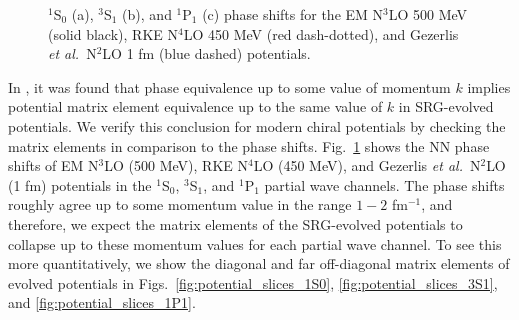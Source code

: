 \documentclass[preprintnumbers,floatfix,aps,prc,preprint,nofootinbib]{revtex4-1}
\begin{document}
\begin{figure}[H]
	\centering
	\quad
	\quad
	\caption{$^1$S$_0$ (a), $^3$S$_1$ (b), and $^1$P$_1$ (c) phase shifts for the EM N$^3$LO 500 MeV (solid black), RKE N$^4$LO 450 MeV (red dash-dotted), and Gezerlis \textit{et al.}~N$^2$LO 1 fm (blue dashed) potentials.}
	\label{fig:phase_shifts}
\end{figure}
%
In \cite{Dainton:2013axa}, it was found that phase equivalence up to some value of momentum $k$ implies potential matrix element equivalence up to the same value of $k$ in SRG-evolved potentials. We verify this conclusion for modern chiral potentials by checking the matrix elements in comparison to the phase shifts. Fig.~\ref{fig:phase_shifts} shows the NN phase shifts of EM N$^3$LO (500 MeV), RKE N$^4$LO (450 MeV), and Gezerlis \textit{et al.}~N$^2$LO (1 fm) potentials in the $^1$S$_0$, $^3$S$_1$, and $^1$P$_1$ partial wave channels. The phase shifts roughly agree up to some momentum value in the range $1-2$ fm$^{-1}$, and therefore, we expect the matrix elements of the SRG-evolved potentials to collapse up to these momentum values for each partial wave channel. To see this more quantitatively, we show the diagonal and far off-diagonal matrix elements of evolved potentials in Figs.~\ref{fig:potential_slices_1S0}, \ref{fig:potential_slices_3S1}, and \ref{fig:potential_slices_1P1}.
\end{document}
